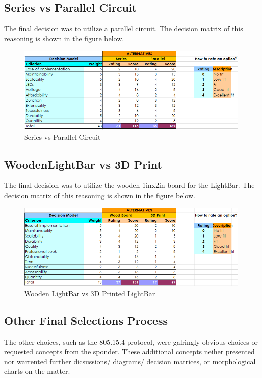 \documentclass[12pt]{article}
\begin{document}
{{{		\subsection{Series vs Parallel Circuit}
			The final decision was to utilize a parallel circuit. The decision matrix of this reasoning is shown in the figure below.
			
			\begin{figure}[ht!]
				\centering
				\includegraphics[width=120mm]{assets/Series_vs_Parallel.png}
				\caption{Series vs Parallel Circuit \label{overflow}}
			\end{figure}
		
		\subsection{WoodenLightBar vs 3D Print}
			The final decision was to utilize the wooden 1inx2in board for the LightBar. The decision matrix of this reasoning is shown in the figure below.
			
			\begin{figure}[ht!]
				\centering
				\includegraphics[width=120mm]{assets/Wood_vs_3D}
				\caption{Wooden LightBar vs 3D Printed LightBar \label{overflow}}
			\end{figure}
			
		\subsection{Other Final Selections Process}
		The other choices, such as the 805.15.4 protocol, were galringly obvious choices or requested concepts from the sponder. These additional concepts neiher presented nor warrented further dicsussions/ diagrams/ decision matrices, or morphological charts on the matter. 
		
}}}
\end{document}
